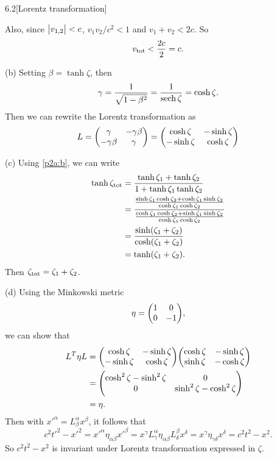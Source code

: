 \documentclass[12pt]{article}
\begin{document}
\begin{problem}{6.2}[Lorentz transformation]
\begin{solution}
Also, since $\abs{v_{1,2}}<c$, $v_1v_2/c^2<1$ and $v_1+v_2<2c$. So
\begin{equation}
    v_{\text{tot}}<\frac{2c}{2}=c. 
\end{equation}

(b) Setting $\beta=\tanh\zeta$, then
\begin{equation}
    \gamma=\frac1{\sqrt{1-\beta^2}}=\frac1{\sech\zeta}=\cosh\zeta. 
\end{equation}
Then we can rewrite the Lorentz transformation as
\begin{equation}
    L=\mqty(\gamma&-\gamma\beta\\-\gamma\beta&\gamma)
    =\mqty(\cosh\zeta&-\sinh\zeta\\-\sinh\zeta&\cosh\zeta)
\end{equation}

(c) Using \eqref{p2a:b}, we can write
\begin{align}
    \tanh\zeta_{\text{tot}}
    &=\frac{\tanh\zeta_1+\tanh\zeta_2}{1+\tanh\zeta_1\tanh\zeta_2}\notag\\
    &=\frac{\frac{\sinh\zeta_1\cosh\zeta_2+\cosh\zeta_1\sinh\zeta_2}{\cosh\zeta_1\cosh\zeta_2}}{\frac{\cosh\zeta_1\cosh\zeta_2+\sinh\zeta_1\sinh\zeta_2}{\cosh\zeta_1\cosh\zeta_2}}\notag\\
    &=\frac{\sinh(\zeta_1+\zeta_2)}{\cosh(\zeta_1+\zeta_2)}\notag\\
    &=\tanh(\zeta_1+\zeta_2).
\end{align}
Then $\zeta_{\text{tot}}=\zeta_1+\zeta_2$.

(d) Using the Minkowski metric
\begin{equation}
    \eta=\mqty(1&0\\0&-1), 
\end{equation}
we can show that
\begin{align}
    L^T\eta L
    &=\mqty(\cosh\zeta&-\sinh\zeta\\-\sinh\zeta&\cosh\zeta)
    \mqty(\cosh\zeta&-\sinh\zeta\\\sinh\zeta&-\cosh\zeta)\notag\\
                    &=\mqty(\cosh^2\zeta-\sinh^2\zeta&0\\0&\sinh^2\zeta-\cosh^2\zeta)\notag\\
    &=\eta.
\end{align}
Then with $x'^\alpha=L_\beta^\alpha x^\beta$, it follows that
\begin{equation}
    c^2t'^2-x'^2
    =x'^\alpha\eta_{\alpha\beta}x'^\beta
    =x^\gamma L^{\alpha}_{\gamma}\eta_{\alpha\beta}L_{\delta}^\beta x^\delta
    =x^\gamma\eta_{\gamma\delta}x^\delta
    =c^2t^2-x^2.
\end{equation}
So $c^2t^2-x^2$ is invariant under Lorentz transformation expressed in $\zeta$.
\end{solution}
\end{problem}
\newpage
\end{document}
